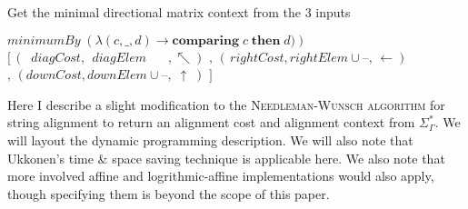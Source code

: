 \documentclass[11pt]{article}
\begin{document}
\begin{algorithm}
  \caption{Get the minimal directional matrix context from the $3$ inputs}\label{getMinimal}
  \begin{algorithmic}[1]
      \State \Return $minimumBy \; \left(\lambda \left(c, \_, d \right) \to \textbf{comparing}\; c \; \textbf{then} \; d)\right)$\newline\hspace*{3.85cm}
      $[\, \left(\;\;diagCost, \;\,diagElem   \quad\;\;\,   ,      \nwarrow    \right)$\newline\hspace*{3.85cm}
      $,\, \left(\, rightCost,    rightElem \cup \textbf{--}, \, \leftarrow    \right)$\newline\hspace*{3.85cm}
      $,\, \left(    downCost,     downElem \cup \textbf{--}, \;   \uparrow \; \right)$\newline\hspace*{3.85cm}
      $]$
    \EndFunction  
  \end{algorithmic}
\end{algorithm}


Here I describe a slight modification to the \textsc{Needleman-Wunsch algorithm} for string alignment to return an alignment cost and alignment context from $\Sigma^{*}_{\Gamma}$. 
We will layout the dynamic programming description. 
We will also note that Ukkonen's time \& space saving technique is applicable here. 
We also note that more involved affine and logrithmic-affine implementations would also apply, though specifying them is beyond the scope of this paper.
\end{document}
